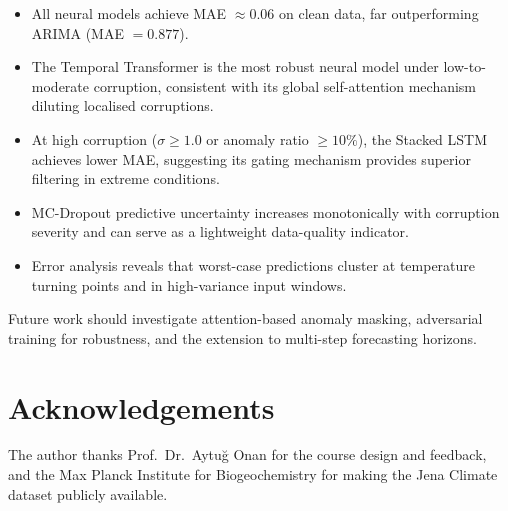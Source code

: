 \documentclass[runningheads]{llncs}
\begin{document}
\begin{itemize}
  \item All neural models achieve MAE $\approx 0.06$ on clean data, far outperforming ARIMA (MAE $= 0.877$).
  \item The Temporal Transformer is the most robust neural model under low-to-moderate corruption, consistent with its global self-attention mechanism diluting localised corruptions.
  \item At high corruption ($\sigma \geq 1.0$ or anomaly ratio $\geq 10\%$), the Stacked LSTM achieves lower MAE, suggesting its gating mechanism provides superior filtering in extreme conditions.
  \item MC-Dropout predictive uncertainty increases monotonically with corruption severity and can serve as a lightweight data-quality indicator.
  \item Error analysis reveals that worst-case predictions cluster at temperature turning points and in high-variance input windows.
\end{itemize}

Future work should investigate attention-based anomaly masking, adversarial training for robustness, and the extension to multi-step forecasting horizons.

\section*{Acknowledgements}
\label{sec:ack}

The author thanks Prof.\ Dr.\ Aytuğ Onan for the course design and feedback, and the Max Planck Institute for Biogeochemistry for making the Jena Climate dataset publicly available.
\end{document}
